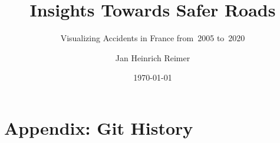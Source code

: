 \documentclass[usegeometry=true]{scrartcl}
\begin{document}
\subject{Project Report for the Module \\  \\ in Summer Semester~2022}
\title{Insights Towards Safer Roads}
\subtitle{Visualizing Accidents in France from~2005 to~2020}
\author{Jan Heinrich Reimer}
\date{\today}
\maketitle

\tableofcontents








\section*{Appendix: Git History}
% 

\printbibliography
\end{document}

